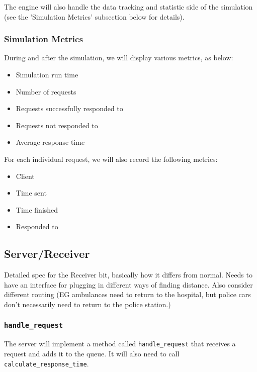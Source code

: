 \documentclass[a4paper]{article}
\begin{document}
The engine will also handle the data tracking and statistic side of the simulation (see the 'Simulation Metrics' subsection below for details).

\subsubsection{Simulation Metrics}%

During and after the simulation, we will display various metrics, as below:

\begin{itemize}
    \item Simulation run time
    \item Number of requests
    \item Requests successfully responded to
    \item Requests not responded to
    \item Average response time
\end{itemize}

For each individual request, we will also record the following metrics:

\begin{itemize}
    \item Client
    \item Time sent
    \item Time finished
    \item Responded to
\end{itemize}

\subsection{Server/Receiver}%

Detailed spec for the Receiver bit, basically how it differs from normal.
Needs to have an interface for plugging in different ways of finding distance.
Also consider different routing (EG ambulances need to return to the hospital,
but police cars don't necessarily need to return to the police station.)

\subsubsection{\lstinline{handle_request}}

The server will implement a method called \lstinline{handle_request} that
receives a request and adds it to the queue. It will also need to call \lstinline{calculate_response_time}.
\end{document}
